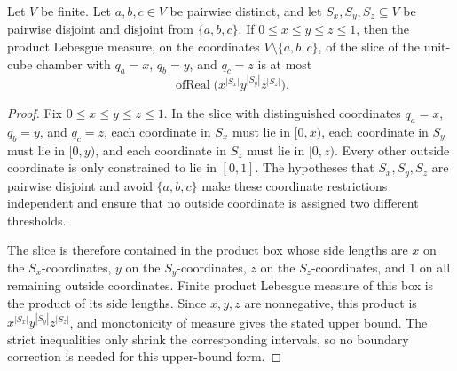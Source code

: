 \begin{helper}
Let \(V\) be finite.  Let \(a,b,c\in V\) be pairwise distinct, and let
\(S_x,S_y,S_z\subseteq V\) be pairwise disjoint and disjoint from
\(\{a,b,c\}\).  If \(0\le x\le y\le z\le1\), then the product Lebesgue
measure, on the coordinates \(V\setminus\{a,b,c\}\), of the slice of the
unit-cube chamber with \(q_a=x\), \(q_b=y\), and \(q_c=z\) is at most
\[
\operatorname{ofReal}\bigl(x^{|S_x|}y^{|S_y|}z^{|S_z|}\bigr).
\]
\end{helper}
\begin{proof}
Fix \(0\le x\le y\le z\le1\).  In the slice with distinguished coordinates
\(q_a=x\), \(q_b=y\), and \(q_c=z\), each coordinate in \(S_x\) must lie in
\([0,x)\), each coordinate in \(S_y\) must lie in \([0,y)\), and each
coordinate in \(S_z\) must lie in \([0,z)\).  Every other outside coordinate
is only constrained to lie in \([0,1]\).  The hypotheses that
\(S_x,S_y,S_z\) are pairwise disjoint and avoid \(\{a,b,c\}\) make these
coordinate restrictions independent and ensure that no outside coordinate is
assigned two different thresholds.

The slice is therefore contained in the product box whose side lengths are
\(x\) on the \(S_x\)-coordinates, \(y\) on the \(S_y\)-coordinates, \(z\) on
the \(S_z\)-coordinates, and \(1\) on all remaining outside coordinates.
Finite product Lebesgue measure of this box is the product of its side
lengths.  Since \(x,y,z\) are nonnegative, this product is
\(x^{|S_x|}y^{|S_y|}z^{|S_z|}\), and monotonicity of measure gives the stated
upper bound.  The strict inequalities only shrink the corresponding intervals,
so no boundary correction is needed for this upper-bound form.
\end{proof}
